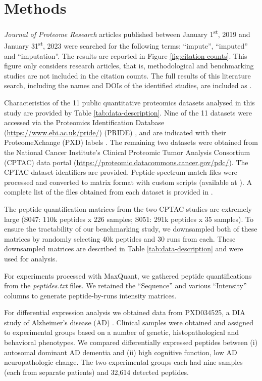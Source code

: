 \documentclass{article}
\newcommand{\fixme}[1]{{\color{red}{#1}}}
\begin{document}
\section{Methods}
\textit{Journal of Proteome Research} articles published between January 1\textsuperscript{st}, 2019 and January 31\textsuperscript{st}, 2023 were searched for the following terms: ``impute'', ``imputed'' and ``imputation''. The results are reported in Figure \ref{fig:citation-counts}. This figure only considers research articles, that is, methodological and benchmarking studies are not included in the citation counts. The full results of this literature search, including the names and DOIs of the identified studies, are included as \fixme{Supplemental Table 1}. 

Characteristics of the 11 public quantitative proteomics datasets analysed in this study are provided by Table \ref{tab:data-description}. Nine of the 11 datasets were accessed via the Proteomics Identification Database (\url{https://www.ebi.ac.uk/pride/}) (PRIDE) \cite{PRIDE}, and are indicated with their ProteomeXchange (PXD) labels \cite{ProteomeXchange}. The remaining two datasets were obtained from the National Cancer Institute's Clinical Proteomic Tumor Analysis Consortium (CPTAC) data portal (\url{https://proteomic.datacommons.cancer.gov/pdc/}). The CPTAC dataset identifiers are provided. Peptide-spectrum match files were processed and converted to matrix format with custom scripts (available at \fixme{\url{https://github.com/Noble-Lab/xxx}}). A complete list of the files obtained from each dataset is provided in \fixme{Supplemental Table 2}. 

The peptide quantification matrices from the two CPTAC studies are extremely large (S047: 110k peptides x 226 samples; S051: 291k peptides x 35 samples). To ensure the tractability of our benchmarking study, we downsampled both of these matrices by randomly selecting 40k peptides and 30 runs from each. These downsampled matrices are described in Table \ref{tab:data-description} and were used for analysis. 

For experiments processed with MaxQuant, we gathered peptide quantifications from the \textit{peptides.txt} files. We retained the ``Sequence'' and various ``Intensity'' columns to generate peptide-by-runs intensity matrices. 

For differential expression analysis we obtained data from PXD034525, a DIA study of Alzheimer's disease (AD) \cite{smtg-maccoss}. Clinical samples were obtained and assigned to experimental groups based on a number of genetic, histopathological and behavioral phenotypes. We compared differentially expressed peptides between (i) autosomal dominant AD dementia and (ii) high cognitive function, low AD neuropathologic change. The two experimental groups each had nine samples (each from separate patients) and 32,614 detected peptides. 
\end{document}
